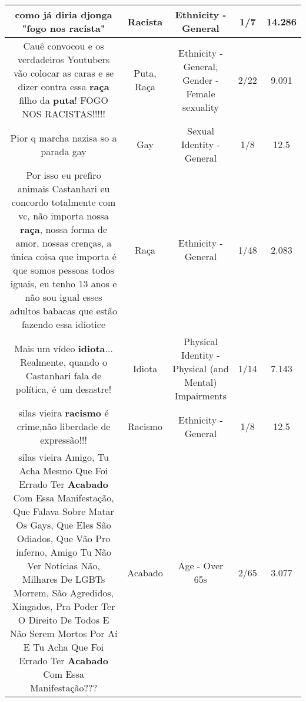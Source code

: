 \documentclass[11pt]{article}
\newlength\mylength
\begin{document}
\begin{center}
\begin{longtable}{|C{.65\mylength}|C{.30\mylength}|C{.12\mylength}|C{.12\mylength}|C{.12\mylength}|}
  \small como já diria djonga "fogo nos \textbf{racista}"\normalsize   & Racista & Ethnicity - General & 1/7 & 14.286 \\  \hline
  \small Cauê convocou e os verdadeiros Youtubers vão colocar as caras e se dizer contra essa \textbf{raça} filho da \textbf{puta}! FOGO NOS RACISTAS!!!!!\normalsize   & Puta, Raça & Ethnicity - General, Gender - Female sexuality & 2/22 & 9.091 \\  \hline
  \small Pior q marcha nazisa so a parada gay\normalsize   & Gay & Sexual Identity - General & 1/8 & 12.5 \\  \hline
  \small Por isso eu prefiro animais Castanhari eu concordo totalmente com vc, não importa nossa \textbf{raça}, nossa forma de amor, nossas crenças, a única coisa que importa é que somos pessoas todos iguais, eu tenho 13 anos e não sou igual esses adultos babacas que estão fazendo essa idiotice\normalsize   & Raça & Ethnicity - General & 1/48 & 2.083 \\  \hline
  \small Mais um vídeo \textbf{idiota}... Realmente, quando o Castanhari fala de política, é um desastre!\normalsize   & Idiota & Physical Identity - Physical (and Mental) Impairments & 1/14 & 7.143 \\  \hline
  \small silas vieira \textbf{racismo} é crime,não liberdade de expressão!!!\normalsize   & Racismo & Ethnicity - General & 1/8 & 12.5 \\  \hline
  \small silas vieira Amigo, Tu Acha Mesmo Que Foi Errado Ter \textbf{Acabado} Com Essa Manifestação, Que Falava Sobre Matar Os Gays, Que Eles São Odiados, Que Vão Pro inferno, Amigo Tu Não Ver Notícias Não, Milhares De LGBTs Morrem, São Agredidos, Xingados, Pra Poder Ter O Direito De Todos  E Não Serem Mortos Por Aí E Tu Acha Que Foi Errado Ter \textbf{Acabado} Com Essa Manifestação???\normalsize   & Acabado & Age - Over 65s & 2/65 & 3.077 \\  \hline

\end{longtable}
\end{center}
\end{document}
